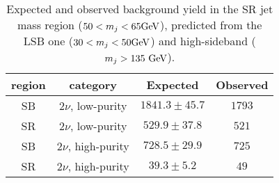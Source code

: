

\begin{table}[!htb]
  \begin{center}
    \begin{tabular}{cc|cc}
      region & category & Expected & Observed \\
      \hline
      SB & $2\nu$, low-purity & $1841.3 \pm 45.7$ & $1793$ \\
      SR & $2\nu$, low-purity & $529.9 \pm 37.8$ & $521$ \\
      \hline
      SB & $2\nu$, high-purity & $728.5 \pm 29.9$ & $725$ \\
      SR & $2\nu$, high-purity & $39.3 \pm 5.2$ & $49$ \\
      \hline
    \end{tabular}
  \end{center}
  \caption{Expected and observed background yield in the SR jet mass region ($ 50 < m_j < 65\text{GeV}$), predicted from the LSB one ($30 < m_j < 50\text{GeV}$) and high-sideband ($m_j > 135~\text{GeV}$).}\label{tab:alphaClosure}
\end{table}

